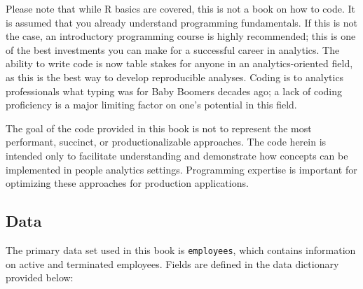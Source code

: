 \documentclass[]{book}
\begin{document}
Please note that while R basics are covered, this is not a book on how to code. It is assumed that you already understand programming fundamentals. If this is not the case, an introductory programming course is highly recommended; this is one of the best investments you can make for a successful career in analytics. The ability to write code is now table stakes for anyone in an analytics-oriented field, as this is the best way to develop reproducible analyses. Coding is to analytics professionals what typing was for Baby Boomers decades ago; a lack of coding proficiency is a major limiting factor on one's potential in this field.

The goal of the code provided in this book is not to represent the most performant, succinct, or productionalizable approaches. The code herein is intended only to facilitate understanding and demonstrate how concepts can be implemented in people analytics settings. Programming expertise is important for optimizing these approaches for production applications.

\hypertarget{data}{%
\subsection{Data}\label{data}}

The primary data set used in this book is \texttt{employees}, which contains information on active and terminated employees. Fields are defined in the data dictionary provided below:
\end{document}
